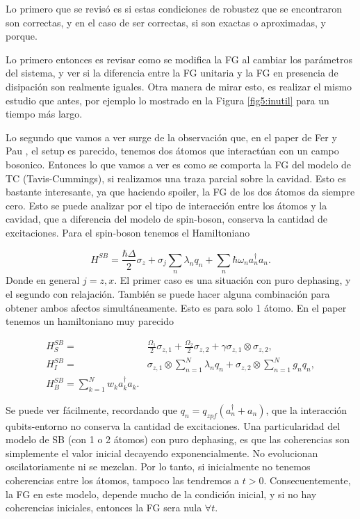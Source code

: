 Lo primero que se revisó es si estas condiciones de robustez que se encontraron son correctas, y en el caso de ser correctas, si son exactas o aproximadas, y porque.

Lo primero entonces es revisar como se modifica la FG al cambiar los parámetros del sistema, y ver si la diferencia entre la FG unitaria y la FG en presencia de disipación son realmente iguales. Otra manera de mirar esto, es realizar el mismo estudio que antes, por ejemplo lo mostrado en la Figura \ref{fig5:inutil} para un tiempo más largo. 

Lo segundo que vamos a ver surge de la observación que, en el paper de Fer y Pau \cite{fg1}, el setup es parecido, tenemos dos átomos que interactúan con un campo bosonico. Entonces lo que vamos a ver es como se comporta la FG del modelo de TC (Tavis-Cummings), si realizamos una traza parcial sobre la cavidad. Esto es bastante interesante, ya que haciendo spoiler, la FG de los dos átomos da siempre cero. Esto se puede analizar por el tipo de interacción entre los átomos y la cavidad, que a diferencia del modelo de spin-boson, conserva la cantidad de excitaciones. Para el spin-boson tenemos el Hamiltoniano 

\begin{equation}
    H^{SB}=\frac{\hbar\Delta}{2}\sigma_z+\sigma_{j}\sum_n\lambda_nq_n+\sum_n\hbar\omega_na_n^\dagger a_n.
\end{equation}
Donde en general $j=z,x$. El primer caso es una situación con puro dephasing, y el segundo con relajación. También se puede hacer alguna combinación para obtener ambos afectos simultáneamente. Esto es para solo 1 átomo. En el paper \cite{fg1} tenemos un hamiltoniano muy parecido

\begin{align}
    H^{SB}_S=&\frac{\Omega_1}{2}\sigma_{z,1}+\frac{\Omega_2}{2}\sigma_{z,2}+\gamma\sigma_{z,1}\otimes\sigma_{z,2}, \\
    H^{SB}_I=&\sigma_{z,1}\otimes\sum_{n=1}^N\lambda_nq_n+\sigma_{z,2}\otimes\sum_{n=1}^Ng_nq_n, \\
    H^{SB}_B=\sum_{k=1}^N w_ka^\dagger_ka_k.
\end{align}

Se puede ver fácilmente, recordando que $q_n=q_{zpf}(a^\dagger_n+a_n)$, que la interacción qubits-entorno no conserva la cantidad de excitaciones. Una particularidad del modelo de SB (con 1 o 2 átomos) con puro dephasing, es que las coherencias son simplemente el valor inicial decayendo exponencialmente. No evolucionan oscilatoriamente ni se mezclan. Por lo tanto, si inicialmente no tenemos coherencias entre los átomos, tampoco las tendremos a $t>0$. Consecuentemente, la FG en este modelo, depende mucho de la condición inicial, y si no hay coherencias iniciales, entonces la FG sera nula $\forall t$. 

